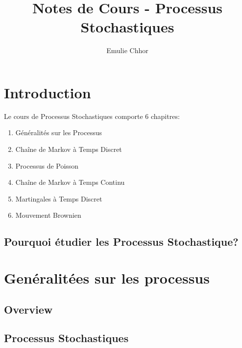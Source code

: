 \documentclass{article}
\begin{document}
\title{Notes de Cours - Processus Stochastiques}
\author{Emulie Chhor}
\maketitle

\section*{Introduction}

Le cours de Processus Stochastiques comporte 6 chapitres:

    \begin{enumerate}
	\item Généralités sur les Processus
	\item Chaîne de Markov à Temps Discret
	\item Processus de Poisson
	\item Chaîne de Markov à Temps Continu
	\item Martingales à Temps Discret
	\item Mouvement Brownien
    \end{enumerate}

\newtheorem{definition}{Definition}[subsection]
\newtheorem{theorem}{Theorem}[subsection]
\newtheorem{corollary}{Corollary}[subsection]
\newtheorem{lemma}[theorem]{Lemma}
\newtheorem{proposition}{Proposition}[section]
\newtheorem{axiom}{Axiome}
\newtheorem{property}{Propriété}[subsection]
\newtheorem*{remark}{Remarque}
\newtheorem*{problem}{Problème}
\newtheorem*{intuition}{Intuition}

\subsection{Pourquoi étudier les Processus Stochastique?}

\pagebreak
\section{Genéralitées sur les processus}

\subsection{Overview}

\subsection{Processus Stochastiques}
\end{document}
